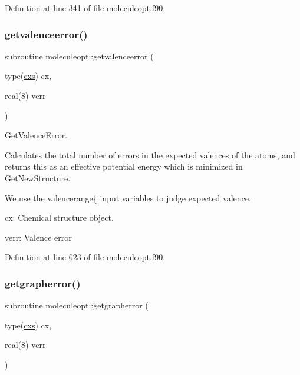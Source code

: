 Definition at line 341 of file moleculeopt.\+f90.

\mbox{\label{namespacemoleculeopt_a294fbc3509e3679a23a37b4a2fc827b4}} 
\subsubsection{\texorpdfstring{getvalenceerror()}{getvalenceerror()}\hspace{0.1cm}{\footnotesize\ttfamily [1/2]}}
{\footnotesize\ttfamily subroutine moleculeopt\+::getvalenceerror (\begin{DoxyParamCaption}\item[{type(\mbox{\hyperlink{structchemstr_1_1cxs}{cxs}})}]{cx,  }\item[{real(8)}]{verr }\end{DoxyParamCaption})}



Get\+Valence\+Error. 

Calculates the total number of errors in the expected valences of the atoms, and returns this as an effective potential energy which is minimized in Get\+New\+Structure.

We use the \textquotesingle{}valencerange\{\textquotesingle{} input variables to judge expected valence.


\begin{DoxyItemize}
\item cx\+: Chemical structure object.
\item verr\+: Valence error 
\end{DoxyItemize}

Definition at line 623 of file moleculeopt.\+f90.

\mbox{\label{namespacemoleculeopt_a5b7e096d3dacf408967cfa4ab8326d11}} 
\subsubsection{\texorpdfstring{getgrapherror()}{getgrapherror()}\hspace{0.1cm}{\footnotesize\ttfamily [1/2]}}
{\footnotesize\ttfamily subroutine moleculeopt\+::getgrapherror (\begin{DoxyParamCaption}\item[{type(\mbox{\hyperlink{structchemstr_1_1cxs}{cxs}})}]{cx,  }\item[{real(8)}]{verr }\end{DoxyParamCaption})}



